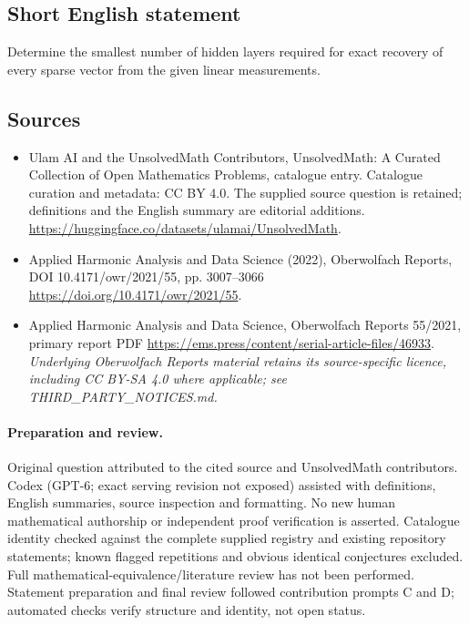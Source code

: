 \documentclass[11pt]{article}
\begin{document}
\subsection{Short English statement}
Determine the smallest number of hidden layers required for exact recovery of every sparse vector from the given linear measurements.
\subsection{Sources}
\begin{itemize}
\item[\hypertarget{source:statement:1}{S1}] Ulam AI and the UnsolvedMath Contributors, UnsolvedMath: A Curated Collection of Open Mathematics Problems, catalogue entry. Catalogue curation and metadata: CC BY 4.0. The supplied source question is retained; definitions and the English summary are editorial additions.
\url{https://huggingface.co/datasets/ulamai/UnsolvedMath}.
\item[\hypertarget{source:statement:2}{S2}] Applied Harmonic Analysis and Data Science (2022), Oberwolfach Reports, DOI 10.4171/owr/2021/55, pp. 3007--3066
\url{https://doi.org/10.4171/owr/2021/55}.
\item[\hypertarget{source:statement:3}{S3}] Applied Harmonic Analysis and Data Science, Oberwolfach Reports 55/2021, primary report PDF
\url{https://ems.press/content/serial-article-files/46933}.
\textit{Underlying Oberwolfach Reports material retains its source-specific licence, including CC BY-SA 4.0 where applicable; see THIRD\_PARTY\_NOTICES.md.}
\end{itemize}
\paragraph{Preparation and review.}
Original question attributed to the cited source and UnsolvedMath contributors. Codex (GPT-6; exact serving revision not exposed) assisted with definitions, English summaries, source inspection and formatting. No new human mathematical authorship or independent proof verification is asserted. Catalogue identity checked against the complete supplied registry and existing repository statements; known flagged repetitions and obvious identical conjectures excluded. Full mathematical-equivalence/literature review has not been performed. Statement preparation and final review followed contribution prompts C and D; automated checks verify structure and identity, not open status.
\label{end:statement}
\end{document}
